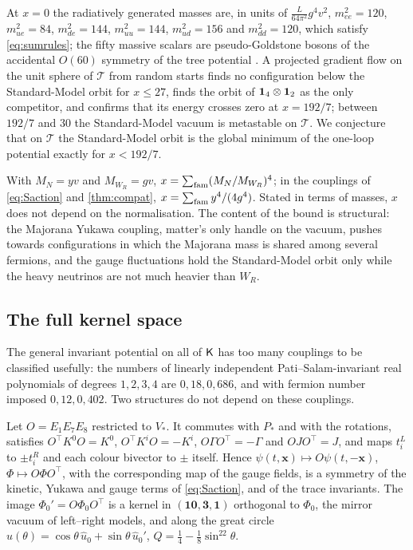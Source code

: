 At $x=0$ the radiatively generated masses are, in units of $\tfrac L{64\pi^2}g^4v^2$, $m_{ee}^2=120$, $m_{ue}^2=84$, $m_{de}^2=144$, $m_{uu}^2=144$, $m_{ud}^2=156$ and
$m_{dd}^2=120$, which satisfy \eqref{eq:sumrules}; the fifty massive scalars are pseudo-Goldstone bosons of the accidental $O(60)$ symmetry of the tree potential
\cite{Weinberg72,GildenerWeinberg76}. A projected gradient flow on the unit sphere of $\mathcal T$ from random starts finds no configuration below the Standard-Model
orbit for $x\le27$, finds the orbit of $\mathbf 1_4\otimes\mathbf 1_2$ as the only competitor, and confirms that its energy crosses zero at $x=192/7$; between $192/7$ and $30$ the
Standard-Model vacuum is metastable on $\mathcal T$. We conjecture that on $\mathcal T$ the Standard-Model orbit is the global minimum of the one-loop potential exactly
for $x<192/7$.

With $M_N=yv$ and $M_{W_R}=gv$, $x=\sum_{\rm fam}(M_N/M_{W_R})^4$; in the couplings of \eqref{eq:Saction} and \cref{thm:compat},
$x=\sum_{\rm fam}y^4/(4g^4)$. Stated in terms of masses, $x$ does not depend on the normalisation. The content of the bound is structural: the Majorana Yukawa coupling, matter's only handle on the
vacuum, pushes towards configurations in which the Majorana mass is shared among several fermions, and the gauge fluctuations hold the Standard-Model orbit only
while the heavy neutrinos are not much heavier than $W_R$.

\subsection{The full kernel space}
\label{sec:fullK}

The general invariant potential on all of $\mathsf K$ has too many couplings to be classified usefully: the numbers of linearly independent Pati--Salam-invariant
real polynomials of degrees $1,2,3,4$ are $0,18,0,686$, and with fermion number imposed $0,12,0,402$. Two structures do not depend on these couplings.

\begin{proposition}
\label{prop:LR}
Let $O=E_1E_7E_8$ restricted to $V_*$. It commutes with $P_*$ and with the rotations, satisfies $O^{\!\top}K^0O=K^0$, $O^{\!\top}K^iO=-K^i$, $O\Gamma O^{\!\top}=-\Gamma$ and
$OJO^{\!\top}=J$, and maps $t^L_i$ to $\pm t^R_i$ and each colour bivector to $\pm$ itself. Hence $\psi(t,\mathbf x)\mapsto O\psi(t,-\mathbf x)$, $\Phi\mapsto O\Phi O^{\!\top}$,
with the corresponding map of the gauge fields, is a symmetry of the kinetic, Yukawa and gauge terms of \eqref{eq:Saction}, and of the trace invariants. The image
$\Phi_0'=O\Phi_0O^{\!\top}$ is a kernel in $(\mathbf{10},\mathbf3,\mathbf1)$ orthogonal to $\Phi_0$, the mirror vacuum of left--right models, and along the great circle
$\hat u(\theta)=\cos\theta\,\hat u_0+\sin\theta\,\hat u_0'$, $Q=\tfrac14-\tfrac18\sin^22\theta$.
\end{proposition}

